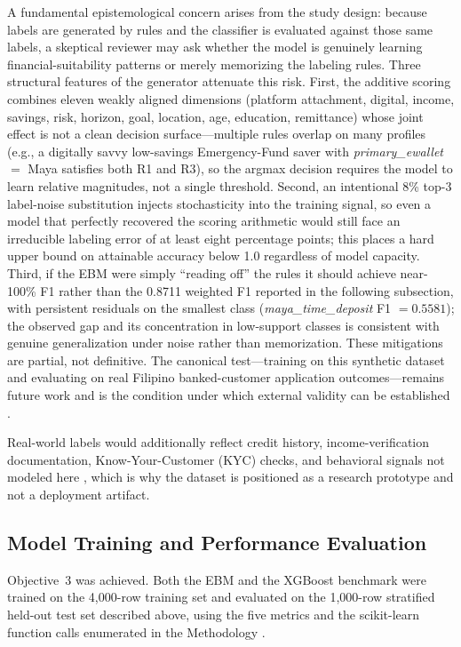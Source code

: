 \documentclass{icsthesis}
\begin{document}
\begin{mainmatter}
					A fundamental epistemological concern arises from the study design: because labels are generated by rules and the classifier is evaluated against those same labels, a skeptical reviewer may ask whether the model is genuinely learning financial-suitability patterns or merely memorizing the labeling rules. Three structural features of the generator attenuate this risk. First, the additive scoring combines eleven weakly aligned dimensions (platform attachment, digital, income, savings, risk, horizon, goal, location, age, education, remittance) whose joint effect is not a clean decision surface---multiple rules overlap on many profiles (e.g., a digitally savvy low-savings Emergency-Fund saver with \emph{primary\_ewallet} $=$ Maya satisfies both R1 and R3), so the argmax decision requires the model to learn relative magnitudes, not a single threshold. Second, an intentional 8\% top-3 label-noise substitution injects stochasticity into the training signal, so even a model that perfectly recovered the scoring arithmetic would still face an irreducible labeling error of at least eight percentage points; this places a hard upper bound on attainable accuracy below 1.0 regardless of model capacity. Third, if the EBM were simply ``reading off'' the rules it should achieve near-100\% F1 rather than the 0.8711 weighted F1 reported in the following subsection, with persistent residuals on the smallest class (\emph{maya\_time\_deposit} F1 $=0.5581$); the observed gap and its concentration in low-support classes is consistent with genuine generalization under noise rather than memorization. These mitigations are partial, not definitive. The canonical test---training on this synthetic dataset and evaluating on real Filipino banked-customer application outcomes---remains future work and is the condition under which external validity can be established \cite{ref46}.

					Real-world labels would additionally reflect credit history, income-verification documentation, Know-Your-Customer (KYC) checks, and behavioral signals not modeled here \cite{ref46}, which is why the dataset is positioned as a research prototype and not a deployment artifact.

			\subsection{Model Training and Performance Evaluation}
				Objective~3 was achieved. Both the EBM and the XGBoost benchmark were trained on the 4{,}000-row training set and evaluated on the 1{,}000-row stratified held-out test set described above, using the five metrics and the scikit-learn function calls enumerated in the Methodology \cite{ref74}.


\end{mainmatter}
\end{document}
